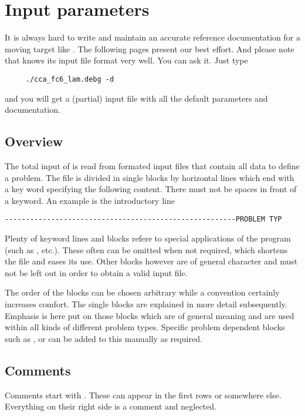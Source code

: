 

\chapter{Input parameters}
\label{input_parameters:chap}

It is always hard to write and maintain an accurate reference documentation
for a moving target like \baci{}. The following pages present our best
effort. And please note that \baci{} knows its input file format very
well. You can ask it. Just type
\begin{verbatim}
     ./cca_fc6_lam.debg -d
\end{verbatim}
and you will get a (partial) input file with all the default parameters and
documentation.

\section{Overview}

The total input of \ccarat{} is read from formated input files that contain
all data to define a problem. The file is divided in single blocks
by horizontal lines which end with a key word specifying the following
content. There must not be spaces in front of a keyword. An example
is the  introductory line 
\begin{verbatim}
-------------------------------------------------------PROBLEM TYP
\end{verbatim}
Plenty of keyword lines and blocks refere to special applications
of the program (such as ,  etc.). These often
can be omitted when not required, which shortens the file and eases
its use. Other blocks however are of general character and must not
be left out in order to obtain a valid input file.

The order of the blocks can be chosen arbitrary while a convention
certainly increases comfort. The single blocks are explained in more
detail subsequently. Emphasis is here put on those blocks which are
of general meaning and are used within all kinds of different problem
types. Specific problem dependent blocks such as ,  or  can be added to this manually as required. 

\section{Comments}
Comments start with \kw{//}. These can appear in the first
rows or somewhere else. Everything on their right side is a comment and
neglected. 

